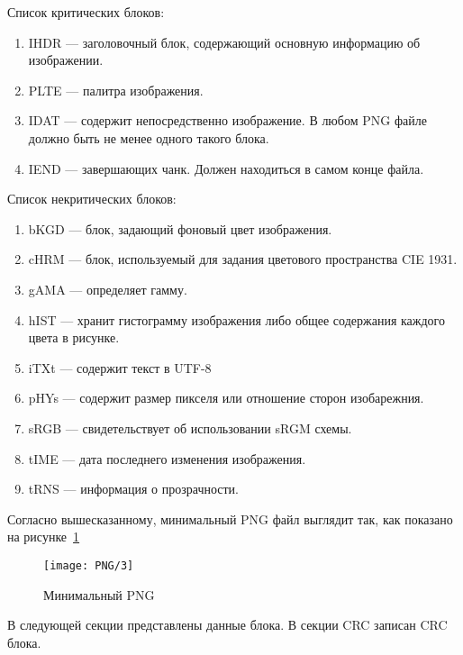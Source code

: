 Список критических блоков:
\begin{enumerate}
    \item IHDR --- заголовочный блок, содержающий основную информацию об изображении.
    \item PLTE --- палитра изображения.
    \item IDAT --- содержит непосредственно изображение.
    В любом PNG файле должно быть не менее одного такого блока.
    \item IEND --- завершающих чанк. Должен находиться в самом конце файла.
\end{enumerate}

Список некритических блоков:
\begin{enumerate}
    \item bKGD --- блок, задающий фоновый цвет изображения.
    \item cHRM --- блок, используемый для задания цветового пространства CIE 1931.
    \item gAMA --- определяет гамму.
    \item hIST --- хранит гистограмму изображения либо общее содержания каждого цвета в рисунке.
    \item iTXt --- содержит текст в UTF-8
    \item pHYs --- содержит размер пикселя или отношение сторон изобарежния.
    \item sRGB --- свидетельствует об использовании sRGM схемы.
    \item tIME --- дата последнего изменения изображения.
    \item tRNS --- информация о прозрачности.
\end{enumerate}

Согласно вышесказанному, минимальный PNG файл выглядит так,
как показано на рисунке~\ref{img:png_3}

\begin{figure}[ht!]
    \caption{Минимальный PNG}
    \texttt{[image: PNG/3]}
    \centering
    \label{img:png_3}
\end{figure}

В следующей секции представлены данные блока.
В секции CRC записан CRC блока.

